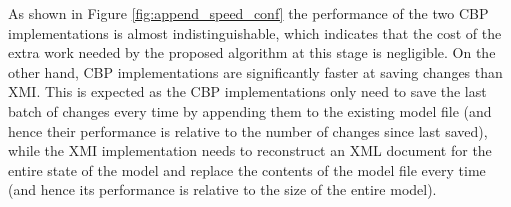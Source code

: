 \documentclass{llncs}
\begin{document}
As shown in Figure \ref{fig:append_speed_conf} the performance of the two CBP implementations is almost indistinguishable, which indicates that the cost of the extra work needed by the proposed algorithm at this stage is negligible. On the other hand, CBP implementations are significantly faster at saving changes than XMI. This is expected as the CBP implementations only need to save the last batch of changes every time by appending them to the existing model file (and hence their performance is relative to the number of changes since last saved), while the XMI implementation needs to reconstruct an XML document for the entire state of the model and replace the contents of the model file every time (and hence its performance is relative to the size of the entire model). 


\end{document}
